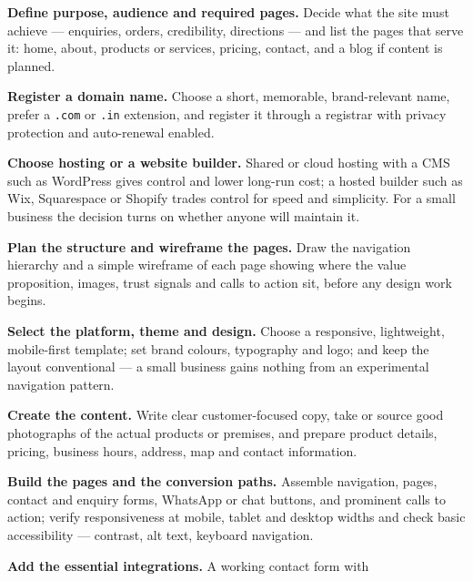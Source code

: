 \begin{qlist}

\begin{apts}
\item \textbf{Define purpose, audience and required pages.} Decide what the
      site must achieve --- enquiries, orders, credibility, directions --- and
      list the pages that serve it: home, about, products or services,
      pricing, contact, and a blog if content is planned.
\item \textbf{Register a domain name.} Choose a short, memorable,
      brand-relevant name, prefer a \texttt{.com} or \texttt{.in} extension,
      and register it through a registrar with privacy protection and
      auto-renewal enabled.
\item \textbf{Choose hosting or a website builder.} Shared or cloud hosting
      with a CMS such as WordPress gives control and lower long-run cost; a
      hosted builder such as Wix, Squarespace or Shopify trades control for
      speed and simplicity. For a small business the decision turns on whether
      anyone will maintain it.
\item \textbf{Plan the structure and wireframe the pages.} Draw the navigation
      hierarchy and a simple wireframe of each page showing where the value
      proposition, images, trust signals and calls to action sit, before any
      design work begins.
\item \textbf{Select the platform, theme and design.} Choose a responsive,
      lightweight, mobile-first template; set brand colours, typography and
      logo; and keep the layout conventional --- a small business gains nothing
      from an experimental navigation pattern.
\item \textbf{Create the content.} Write clear customer-focused copy, take or
      source good photographs of the actual products or premises, and prepare
      product details, pricing, business hours, address, map and contact
      information.
\item \textbf{Build the pages and the conversion paths.} Assemble navigation,
      pages, contact and enquiry forms, WhatsApp or chat buttons, and prominent
      calls to action; verify responsiveness at mobile, tablet and desktop
      widths and check basic accessibility --- contrast, alt text, keyboard
      navigation.
\item \textbf{Add the essential integrations.} A working contact form with

\end{apts}
\end{qlist}
